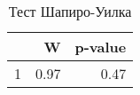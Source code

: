 \begin{table}[ht]
\centering
\begin{tabular}{rrr}
  \hline
 & W & p-value \\ 
  \hline
1 & 0.97 & 0.47 \\ 
   \hline
\end{tabular}
\caption{Тест Шапиро-Уилка} 
\label{table:shapiro}
\end{table}